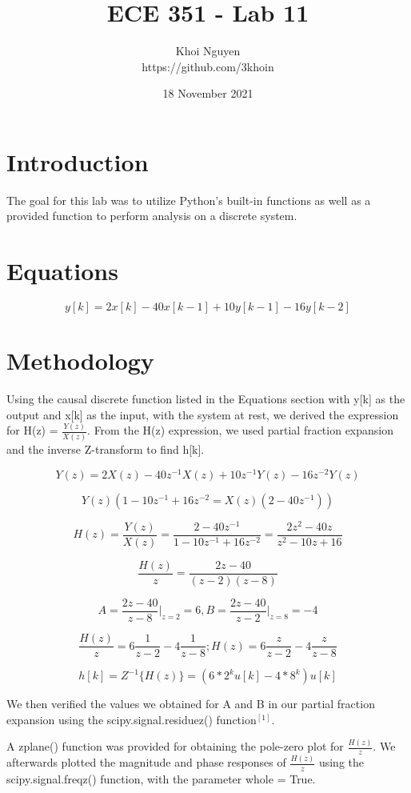 \documentclass[11pt,a4,titlepage]{article}
\title{ECE 351 - Lab 11}
\author{Khoi Nguyen \\ https://github.com/3khoin}
\date{18 November 2021}
\begin{document}
\maketitle
\pagebreak

\tableofcontents
\pagebreak
	
\section{Introduction}
The goal for this lab was to utilize Python's built-in functions as well as a provided function to perform analysis on a discrete system.

\section{Equations}
\[y[k] = 2x[k] - 40x[k-1] + 10y[k-1] - 16y[k-2]\]

\section{Methodology}
Using the causal discrete function listed in the Equations section with y[k] as the output and x[k] as the input, with the system at rest, we derived the expression for H(z) = $\frac{Y(z)}{X(z)}$. From the H(z) expression, we used partial fraction expansion and the inverse Z-transform to find h[k].

\[Y(z) = 2X(z) - 40z^{-1}X(z) + 10z^{-1}Y(z) - 16z^{-2}Y(z)\]

\[Y(z)(1 - 10z^{-1} + 16z^{-2} = X(z)(2 - 40z^{-1}))\]

\[H(z) = \frac{Y(z)}{X(z)} = \frac{2 - 40z^{-1}}{1 - 10z^{-1} + 16z^{-2}} = \frac{2z^{2} - 40z}{z^{2} - 10z + 16}\]

\[\frac{H(z)}{z} = \frac{2z - 40}{(z-2)(z-8)}\]

\[A = \frac{2z - 40}{z - 8}\rvert_{z = 2} = 6, B = \frac{2z - 40}{z - 2}\rvert_{z = 8} = -4\]

\[\frac{H(z)}{z} = 6\frac{1}{z - 2} - 4\frac{1}{z - 8}; H(z) = 6\frac{z}{z - 2} - 4\frac{z}{z - 8}\]

\[h[k] = Z^{-1}\{H(z)\} = (6 * 2^{k}u[k] - 4 * 8^{k})u[k]\]

We then verified the values we obtained for A and B in our partial fraction expansion using the scipy.signal.residuez() function$^{[1]}$.

A zplane() function was provided for obtaining the pole-zero plot for $\frac{H(z)}{z}$. We afterwards plotted the magnitude and phase responses of $\frac{H(z)}{z}$ using the scipy.signal.freqz() function, with the parameter whole = True.
\end{document}
